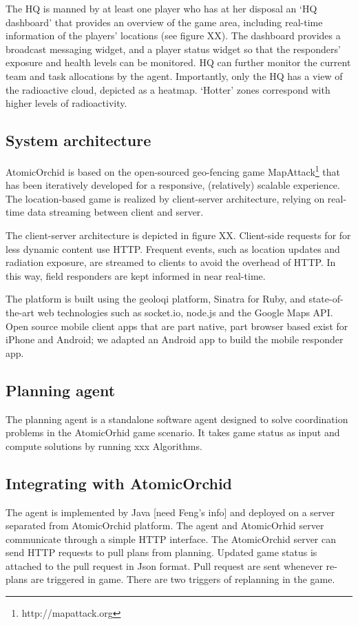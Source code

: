 The HQ is manned by at least one player who has at her disposal an `HQ dashboard' that provides an overview of the game area, including real-time information of the players' locations (see figure XX). The dashboard provides a broadcast messaging widget, and a player status widget so that the responders' exposure and health levels can be monitored. HQ can further monitor the  current team and task allocations by the agent. Importantly, only the HQ has a view of the radioactive cloud, depicted as a heatmap. `Hotter' zones correspond with higher levels of radioactivity.

\subsection{System architecture}
AtomicOrchid is based on the open-sourced geo-fencing game MapAttack\footnote{http://mapattack.org} that has been iteratively developed for a responsive, (relatively) scalable experience.  The location-based game is realized by client-server architecture, relying on real-time data streaming between client and server.

The client-server architecture is depicted in figure XX. Client-side requests for for less dynamic content use HTTP. Frequent events, such as location updates and radiation exposure, are streamed to clients to avoid the overhead of HTTP. In this way, field responders are kept informed in near real-time.

The platform is built using the geoloqi platform, Sinatra for Ruby, and state-of-the-art web technologies such as socket.io, node.js and the Google Maps API. Open source mobile client apps that are part native, part browser based exist for iPhone and Android; we adapted an Android app to build the mobile responder app.

\subsection{Planning agent}
The planning agent is a standalone software agent designed to solve coordination problems in the AtomicOrhid game scenario. It takes game status as input and compute solutions by running xxx Algorithms. 

\subsection{Integrating with AtomicOrchid}
The agent is implemented by Java [need Feng's info] and deployed on a server separated from AtomicOrchid platform. The agent and AtomicOrhid server communicate through a simple HTTP interface. The AtomicOrchid server can send HTTP requests to pull plans from planning. Updated game status is attached to the pull request in Json format. Pull request are sent whenever re-plans are triggered in game. There are two triggers of replanning in the game.


